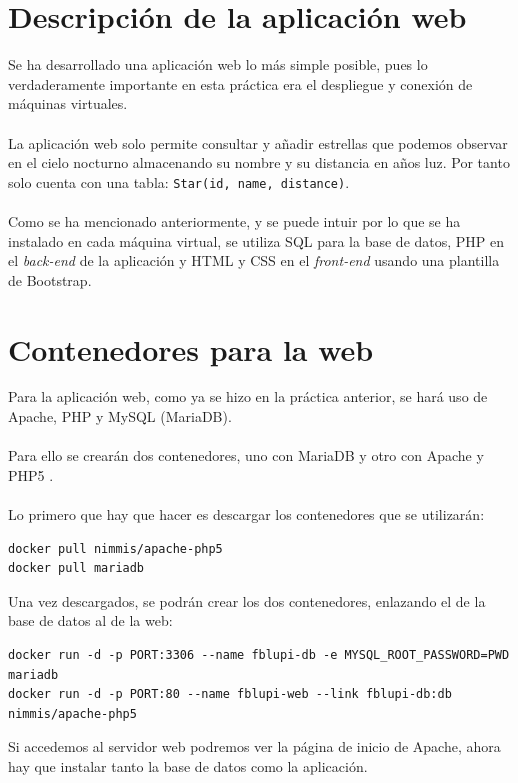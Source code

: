 \section{Descripción de la aplicación web}

Se ha desarrollado una aplicación web lo más simple posible, pues lo verdaderamente importante en esta práctica era el despliegue y conexión de máquinas virtuales.
\\ \\
La aplicación web solo permite consultar y añadir estrellas que podemos observar en el cielo nocturno almacenando su nombre y su distancia en años luz. Por tanto solo cuenta con una tabla: \texttt{Star(id, name, distance)}.
\\ \\
Como se ha mencionado anteriormente, y se puede intuir por lo que se ha instalado en cada máquina virtual, se utiliza SQL para la base de datos, PHP en el \textit{back-end} de la aplicación y HTML y CSS en el \textit{front-end} usando una plantilla de Bootstrap.

\section{Contenedores para la web}

Para la aplicación web, como ya se hizo en la práctica anterior, se hará uso de Apache, PHP y MySQL (MariaDB).
\\ \\
Para ello se crearán dos contenedores, uno con MariaDB y otro con Apache y PHP5 \cite{DockerPHPMySQL} \cite{DockerMariaDB}.
\\ \\
Lo primero que hay que hacer es descargar los contenedores que se utilizarán:

\begin{lstlisting}
docker pull nimmis/apache-php5
docker pull mariadb
\end{lstlisting}

Una vez descargados, se podrán crear los dos contenedores, enlazando el de la base de datos al de la web:

\begin{lstlisting}
docker run -d -p PORT:3306 --name fblupi-db -e MYSQL_ROOT_PASSWORD=PWD mariadb
docker run -d -p PORT:80 --name fblupi-web --link fblupi-db:db nimmis/apache-php5 
\end{lstlisting}

Si accedemos al servidor web podremos ver la página de inicio de Apache, ahora hay que instalar tanto la base de datos como la aplicación.

